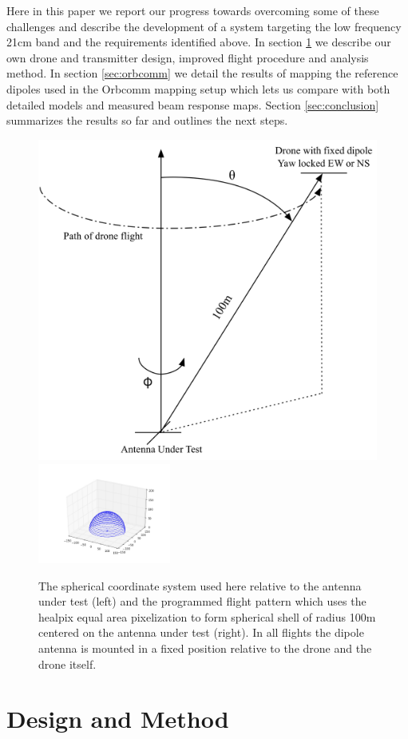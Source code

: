 \documentclass[preprint2,numberedappendix,tighten,twocolappendix]{aastex6}
\begin{document}
Here in this paper we report our progress towards overcoming some of these challenges and describe the development of a system targeting the low frequency 21cm band and the requirements identified above.  In section \ref{sec:design} we describe our own drone and transmitter design, improved flight procedure and analysis method.  In section \ref{sec:orbcomm} we detail the results of mapping the reference dipoles used in the Orbcomm mapping setup which lets us compare with both detailed models and measured beam response maps.  Section \ref{sec:conclusion} summarizes the results so far and outlines the next steps.


\begin{figure}[htb]
\begin{center}
\includegraphics[width=0.6\columnwidth]{figures/ECHO_flight_diagram.png}
\includegraphics[width=0.39\textwidth]{figures/ECHO_flight_path.png}
\caption{The spherical coordinate system used here relative to the antenna under test (left) and the programmed flight pattern which uses the healpix equal area pixelization to form spherical shell of radius 100m centered on the antenna under test (right). In all flights the dipole antenna is mounted in a fixed position relative to the drone and the drone itself. }
\end{center}
\end{figure}

\section{Design and Method}
\label{sec:design}
\end{document}
